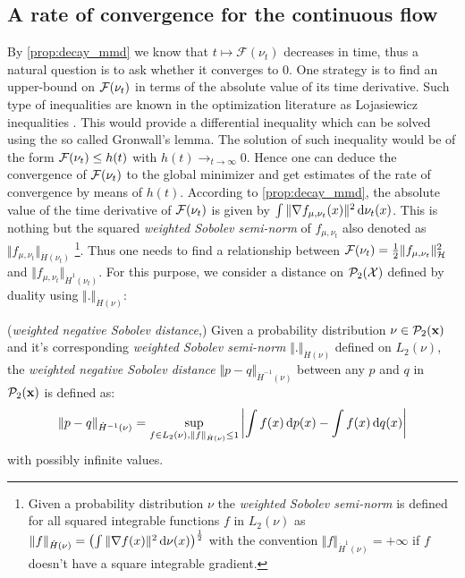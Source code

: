 \subsection{A rate of convergence for the continuous flow}\label{sec:Lojasiewicz_inequality}
By \cref{prop:decay_mmd} we know that $t\mapsto\mathcal{F}(\nu_t)$ decreases in time, thus a natural question is to ask whether it converges to $0$. One strategy is to find an upper-bound on ${{\mathcal F}}(\nu_t)$ in terms of the absolute value of its time derivative. Such type of inequalities are known in the optimization literature as Lojasiewicz inequalities .
This would provide a differential inequality which can be solved using the so called Gronwall's lemma. The solution of such inequality would be of the form ${{\mathcal F}}(\nu_t)\leq h(t)$ with $h(t)\rightarrow_{t\rightarrow \infty} 0$. Hence one can deduce the convergence of ${{\mathcal F}}(\nu_t)$ to the global minimizer and get estimates of the rate of convergence by means of $h(t)$.
According to \cref{prop:decay_mmd}, the absolute value of the time derivative of ${{\mathcal F}}(\nu_t)$ is given by $\int \Vert \nabla f_{\mu,\nu_t}(x) \Vert^2 \mathop{}\!\mathrm{d} \nu_t(x)$. This is nothing but the squared \textit{weighted Sobolev semi-norm} of $f_{\mu,\nu_t}$ also denoted as $\Vert f_{\mu,\nu_t} \Vert_{\dot{H}(\nu_t)}$ \footnote{Given a probability distribution $\nu$ the \textit{weighted Sobolev semi-norm} is defined for all squared integrable functions $f$ in $L_2(\nu)$ as $ \Vert f \Vert_{\dot{H}(\nu)} = \left(\int \Vert \nabla f(x) \Vert^2 \mathop{}\!\mathrm{d} \nu(x) \right)^{\frac{1}{2}}$ with the convention $\Vert f \Vert_{\dot{H}^1(\nu)} = +\infty$ if $f$ doesn't have a square integrable gradient.}. Thus one needs to find a relationship between ${{\mathcal F}}(\nu_t) = \frac{1}{2} \Vert f_{\mu,\nu_t} \Vert_{\mathcal{H}}^2 $ and $\Vert f_{\mu,\nu_t} \Vert_{\dot{H}^1(\nu_t)}$. For this purpose, we consider a distance on $\mathcal{P}_2({{\mathcal X}})$ defined by duality using $\Vert . \Vert_{\dot{H}(\nu)}$:
\begin{definition}\label{def:neg_sobolev}
(\textit{weighted negative Sobolev distance},\cite{Peyre:2011})
	Given a probability distribution $\nu\in \mathcal{P}_2({\mathbf x})$ and it's corresponding \textit{weighted Sobolev semi-norm} $ \Vert . \Vert_{\dot{H}(\nu)} $ defined on $L_2(\nu)$, the \textit{weighted negative Sobolev distance} $\Vert p - q \Vert_{\dot{H}^{-1}(\nu)}$ between any $p$ and $q$ in $\mathcal{P}_2({\mathbf x})$  is defined as:
\begin{align}\label{eq:neg_sobolev}
	\Vert p - q \Vert_{\dot{H}^{-1}(\nu)} = \sup_{f\in L_2(\nu), \Vert f \Vert_{\dot{H}(\nu)} \leq 1 } \left\vert \int f(x)\mathop{}\!\mathrm{d} p(x) - \int f(x)\mathop{}\!\mathrm{d} q(x) \right\vert 
\end{align}	
with possibly infinite values.
\end{definition}

